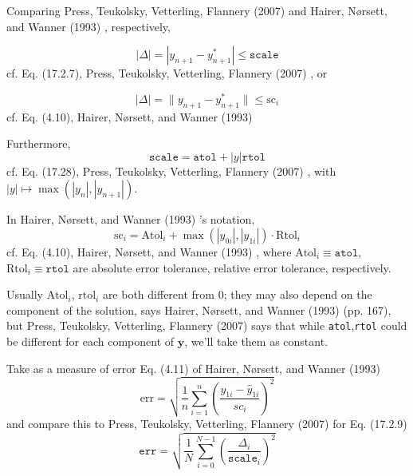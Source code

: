 \documentclass[10pt]{amsart}
\begin{document}
\begin{multicols*}{2}
Comparing Press, Teukolsky, Vetterling, Flannery (2007) \cite{PTVF2007} and Hairer, N\o rsett, and Wanner (1993) \cite{HNW1993}, respectively,

\begin{equation}
	|\Delta | = |y_{n+1} - y_{n+1}^* | \leq \texttt{scale}
\end{equation}
cf. Eq. (17.2.7), Press, Teukolsky, Vetterling, Flannery (2007) \cite{PTVF2007}, or

\begin{equation}
	| \Delta | = \| y_{n+1}- y^*_{n+1} \| \leq \text{sc}_i
\end{equation}
cf. Eq. (4.10), Hairer, N\o rsett, and Wanner (1993) \cite{HNW1993}

Furthermore,
\begin{equation}
	\texttt{scale} = \texttt{atol} + |y| \texttt{rtol}
\end{equation}
cf. Eq. (17.28), Press, Teukolsky, Vetterling, Flannery (2007) \cite{PTVF2007}, with $|y| \mapsto \max{(|y_n|, |y_{n+1}|)}$.

In Hairer, N\o rsett, and Wanner (1993) \cite{HNW1993}'s notation,
\begin{equation}
	\text{sc}_i = \text{Atol}_i + \max{(|y_{0i}|, |y_{1i}|)} \cdot \text{Rtol}_i
\end{equation}
cf. Eq. (4.10), Hairer, N\o rsett, and Wanner (1993) \cite{HNW1993}, where $\text{Atol}_i \equiv \texttt{atol}$, $\text{Rtol}_i \equiv \texttt{rtol}$ are absolute error tolerance, relative error tolerance, respectively.

Usually $\text{Atol}_i$, $\text{rtol}_i$ are both different from 0; they may also depend on the component of the solution, says Hairer, N\o rsett, and Wanner (1993) \cite{HNW1993} (pp. 167), but Press, Teukolsky, Vetterling, Flannery (2007) says that while \texttt{atol},\texttt{rtol} could be different for each component of $\mathbf{y}$, we'll take them as constant.

Take as a measure of error Eq. (4.11) of Hairer, N\o rsett, and Wanner (1993) \cite{HNW1993}
\begin{equation}\label{Eq:EmbeddedRKError}
	\text{err} = \sqrt{ \frac{1}{n} \sum_{i=1}^n \left( \frac{ y_{1i} - \widehat{y}_{1i} }{sc_i} \right)^2 }
\end{equation}
and compare this to Press, Teukolsky, Vetterling, Flannery (2007) for Eq. (17.2.9)
\begin{equation}
	\texttt{err} = \sqrt{ \frac{1}{N} \sum_{i=0}^{N-1} \left( \frac{ \Delta_i}{ \texttt{scale}_i } \right)^2 }
\end{equation}


\end{multicols*}
\end{document}
